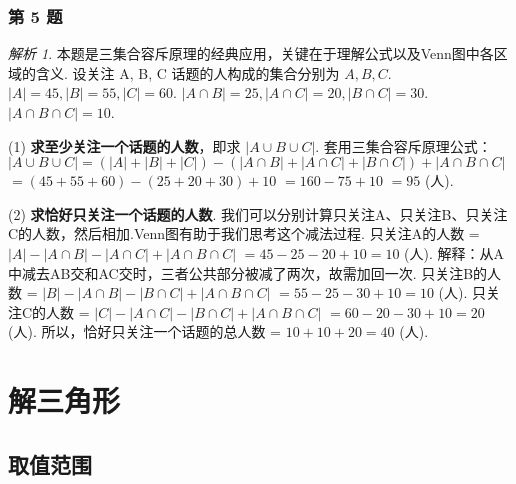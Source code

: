 \documentclass[12pt,a4paper]{ctexbook}
\theoremstyle{definition}
\theoremstyle{remark}
\newtheorem*{solution}{解析}
\begin{document}
	\subsubsection*{第 5 题}
	\begin{solution}
		本题是三集合容斥原理的经典应用，关键在于理解公式以及Venn图中各区域的含义.
		设关注 A, B, C 话题的人构成的集合分别为 $A, B, C$.
		$|A|=45, |B|=55, |C|=60$.
		$|A \cap B|=25, |A \cap C|=20, |B \cap C|=30$.
		$|A \cap B \cap C|=10$.
		
		(1) \textbf{求至少关注一个话题的人数}，即求 $|A \cup B \cup C|$.
		套用三集合容斥原理公式：
		$|A \cup B \cup C| = (|A|+|B|+|C|) - (|A \cap B|+|A \cap C|+|B \cap C|) + |A \cap B \cap C|$
		$= (45+55+60) - (25+20+30) + 10$
		$= 160 - 75 + 10$
		$= 95$ (人).
		
		(2) \textbf{求恰好只关注一个话题的人数}.
		我们可以分别计算只关注A、只关注B、只关注C的人数，然后相加.Venn图有助于我们思考这个减法过程.
		只关注A的人数 = $|A| - |A \cap B| - |A \cap C| + |A \cap B \cap C|$
		$= 45 - 25 - 20 + 10 = 10$ (人).
		解释：从A中减去AB交和AC交时，三者公共部分被减了两次，故需加回一次.
		只关注B的人数 = $|B| - |A \cap B| - |B \cap C| + |A \cap B \cap C|$
		$= 55 - 25 - 30 + 10 = 10$ (人).
		只关注C的人数 = $|C| - |A \cap C| - |B \cap C| + |A \cap B \cap C|$
		$= 60 - 20 - 30 + 10 = 20$ (人).
		所以，恰好只关注一个话题的总人数 = $10 + 10 + 20 = 40$ (人).
	\end{solution}
	
	\section{解三角形}
	\subsection{取值范围}
\end{document}
